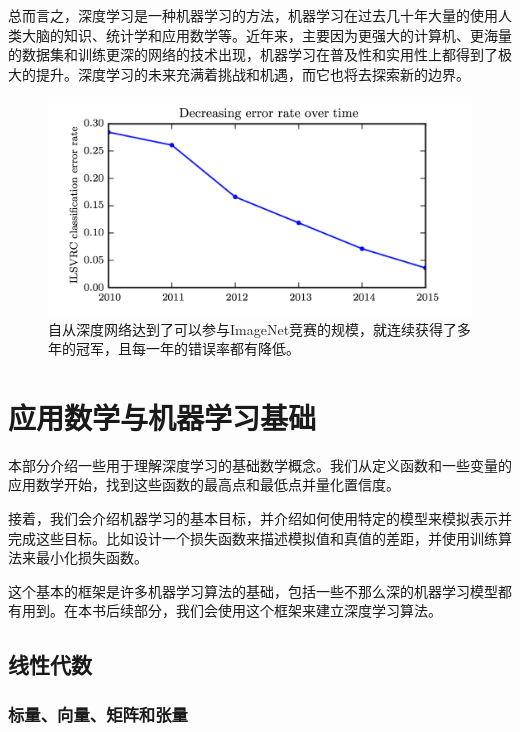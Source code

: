 \documentclass[a4paper,11pt]{book}
\begin{document}
总而言之，深度学习是一种机器学习的方法，机器学习在过去几十年大量的使用人类大脑的知识、统计学和应用数学等。近年来，主要因为更强大的计算机、更海量的数据集和训练更深的网络的技术出现，机器学习在普及性和实用性上都得到了极大的提升。深度学习的未来充满着挑战和机遇，而它也将去探索新的边界。

   

	

\begin{figure}[htbp] %
   \centering
   \includegraphics[width=6in]{fig/chap1/1.12.png} 
   \caption{自从深度网络达到了可以参与ImageNet竞赛的规模，就连续获得了多年的冠军，且每一年的错误率都有降低。}
   \label{fig:1.12}
\end{figure}


\part{应用数学与机器学习基础}
\label{part:1}

本部分介绍一些用于理解深度学习的基础数学概念。我们从定义函数和一些变量的应用数学开始，找到这些函数的最高点和最低点并量化置信度。


接着，我们会介绍机器学习的基本目标，并介绍如何使用特定的模型来模拟表示并完成这些目标。比如设计一个损失函数来描述模拟值和真值的差距，并使用训练算法来最小化损失函数。


这个基本的框架是许多机器学习算法的基础，包括一些不那么深的机器学习模型都有用到。在本书后续部分，我们会使用这个框架来建立深度学习算法。

\chapter{线性代数}
\label{chap:2}

\section{标量、向量、矩阵和张量}
\label{sec:2.1}
\end{document}
